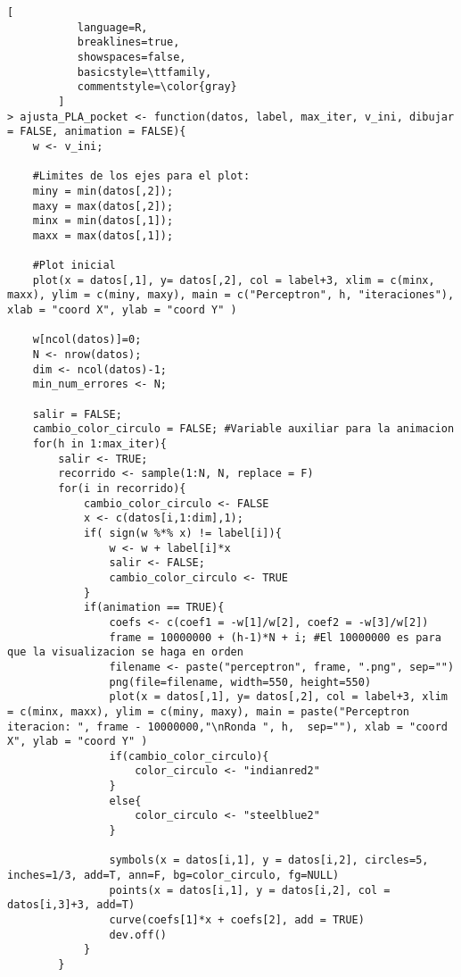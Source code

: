 \documentclass[11pt,fleqn]{book} %
\begin{document}
\begin{lstlisting}[
           language=R,
           breaklines=true,
           showspaces=false,
           basicstyle=\ttfamily,
           commentstyle=\color{gray}
        ]
> ajusta_PLA_pocket <- function(datos, label, max_iter, v_ini, dibujar = FALSE, animation = FALSE){
    w <- v_ini;
    
    #Limites de los ejes para el plot:
    miny = min(datos[,2]);
    maxy = max(datos[,2]);
    minx = min(datos[,1]);
    maxx = max(datos[,1]);
    
    #Plot inicial
    plot(x = datos[,1], y= datos[,2], col = label+3, xlim = c(minx, maxx), ylim = c(miny, maxy), main = c("Perceptron", h, "iteraciones"), xlab = "coord X", ylab = "coord Y" )
    
    w[ncol(datos)]=0;
    N <- nrow(datos);
    dim <- ncol(datos)-1;
    min_num_errores <- N;
    
    salir = FALSE;
    cambio_color_circulo = FALSE; #Variable auxiliar para la animacion
    for(h in 1:max_iter){
        salir <- TRUE;
        recorrido <- sample(1:N, N, replace = F)
        for(i in recorrido){
            cambio_color_circulo <- FALSE
            x <- c(datos[i,1:dim],1);
            if( sign(w %*% x) != label[i]){
                w <- w + label[i]*x
                salir <- FALSE;
                cambio_color_circulo <- TRUE
            }
            if(animation == TRUE){
                coefs <- c(coef1 = -w[1]/w[2], coef2 = -w[3]/w[2])
                frame = 10000000 + (h-1)*N + i; #El 10000000 es para que la visualizacion se haga en orden
                filename <- paste("perceptron", frame, ".png", sep="")
                png(file=filename, width=550, height=550)
                plot(x = datos[,1], y= datos[,2], col = label+3, xlim = c(minx, maxx), ylim = c(miny, maxy), main = paste("Perceptron iteracion: ", frame - 10000000,"\nRonda ", h,  sep=""), xlab = "coord X", ylab = "coord Y" )
                if(cambio_color_circulo){
                    color_circulo <- "indianred2"
                }
                else{
                    color_circulo <- "steelblue2"
                }
                
                symbols(x = datos[i,1], y = datos[i,2], circles=5, inches=1/3, add=T, ann=F, bg=color_circulo, fg=NULL)
                points(x = datos[i,1], y = datos[i,2], col = datos[i,3]+3, add=T)
                curve(coefs[1]*x + coefs[2], add = TRUE)
                dev.off()
            }
        }
        

\end{lstlisting}
\end{document}
